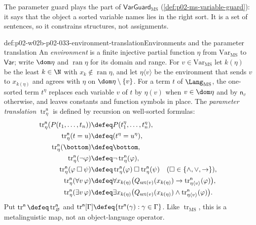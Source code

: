 The parameter guard plays the part of
\(\mathsf{VarGuard}_{\mathrm{MS}}\) (\cref{def:p02-ms-variable-guard}): it
says that the object a sorted variable names lies in the right sort.  It is a
set of sentences, so it constrains structures, not assignments.

\begin{hbdefinition}{def:p02-w02b-p02-033-environment-translation}{Environments and the parameter translation}
An \emph{environment} is a finite injective partial function
\(\eta\) from \(\mathrm{Var}_{\mathrm{MS}}\) to \(\mathsf{Var}\); write
\(\dom\eta\) and \(\operatorname{ran}\eta\) for its domain and range.  For
\(v\in\mathrm{Var}_{\mathrm{MS}}\) let \(k(\eta)\) be the least \(k\in\N\)
with \(x_k\notin\operatorname{ran}\eta\), and let \(\eta\langle v\rangle\) be
the environment that sends \(v\) to \(x_{k(\eta)}\) and agrees with \(\eta\)
on \(\dom\eta\setminus\{v\}\).  For a term \(t\) of
\(\Lang_{\mathrm{MS}}\), the one-sorted term \(t^{\eta}\) replaces each
variable \(v\) of \(t\) by \(\eta(v)\) when \(v\in\dom\eta\) and by
\(\mathsf n_v\) otherwise, and leaves constants and function symbols in
place.  The \emph{parameter translation}
\(\operatorname{tr}^{\mathsf n}_{\eta}\) is defined by recursion on
well-sorted formulas:
\[
\begin{aligned}
 \operatorname{tr}^{\mathsf n}_{\eta}(P(t_1,\ldots,t_n))
   &\defeq P(t_1^{\eta},\ldots,t_n^{\eta}),\\
 \operatorname{tr}^{\mathsf n}_{\eta}(t=u)
   &\defeq(t^{\eta}=u^{\eta}),\\
 \operatorname{tr}^{\mathsf n}_{\eta}(\bottom)
   &\defeq\bottom,\\
 \operatorname{tr}^{\mathsf n}_{\eta}(\neg\varphi)
   &\defeq\neg\operatorname{tr}^{\mathsf n}_{\eta}(\varphi),\\
 \operatorname{tr}^{\mathsf n}_{\eta}(\varphi\mathbin{\square}\psi)
   &\defeq\operatorname{tr}^{\mathsf n}_{\eta}(\varphi)\mathbin{\square}
     \operatorname{tr}^{\mathsf n}_{\eta}(\psi)
   \quad(\square\in\{\land,\lor,\to\}),\\
 \operatorname{tr}^{\mathsf n}_{\eta}(\forall v\,\varphi)
   &\defeq\forall x_{k(\eta)}\bigl(Q_{\operatorname{srt}(v)}(x_{k(\eta)})\to
     \operatorname{tr}^{\mathsf n}_{\eta\langle v\rangle}(\varphi)\bigr),\\
 \operatorname{tr}^{\mathsf n}_{\eta}(\exists v\,\varphi)
   &\defeq\exists x_{k(\eta)}\bigl(Q_{\operatorname{srt}(v)}(x_{k(\eta)})\land
     \operatorname{tr}^{\mathsf n}_{\eta\langle v\rangle}(\varphi)\bigr).
\end{aligned}
\]
Put \(\operatorname{tr}^{\mathsf n}\defeq\operatorname{tr}^{\mathsf n}_{\varnothing}\)
and \(\operatorname{tr}^{\mathsf n}[\Gamma]\defeq
\{\operatorname{tr}^{\mathsf n}(\gamma):\gamma\in\Gamma\}\).  Like
\(\operatorname{tr}_{\mathrm{MS}}\), this is a metalinguistic map, not an
object-language operator.
\end{hbdefinition}

